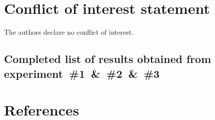\documentclass[review]{elsarticle}
\begin{document}
%

\section*{Conflict of interest statement}

The authors declare no conflict of interest.

\begin{appendices}
\section{Completed list of results obtained from experiment~\#1~\&~\#2~\&~\#3}\label{app:1}



\end{appendices}


\section*{References}
\end{document}
